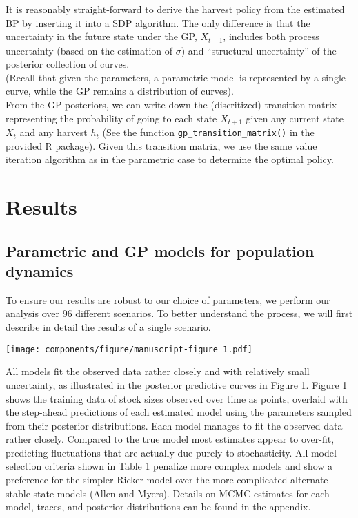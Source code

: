 \documentclass[]{components/elsarticle}
\begin{document}
It is reasonably straight-forward to derive the harvest policy from the
estimated BP by inserting it into a SDP algorithm. The only difference
is that the uncertainty in the future state under the GP, $X_{t+1}$,
includes both process uncertainty (based on the estimation of $\sigma$)
and ``structural uncertainty'' of the posterior collection of
curves.\\(Recall that given the parameters, a parametric model is
represented by a single curve, while the GP remains a distribution of
curves).\\From the GP posteriors, we can write down the (discritized)
transition matrix representing the probability of going to each state
$X_{t+1}$ given any current state $X_t$ and any harvest $h_t$ (See the
function \texttt{gp\_transition\_matrix()} in the provided R package).
Given this transition matrix, we use the same value iteration algorithm
as in the parametric case to determine the optimal policy.

\section{Results}\label{results}

\subsection{Parametric and GP models for population
dynamics}\label{parametric-and-gp-models-for-population-dynamics}

To ensure our results are robust to our choice of parameters, we perform
our analysis over 96 different scenarios. To better understand the
process, we will first describe in detail the results of a single
scenario.

\texttt{[image: components/figure/manuscript-figure\_1.pdf]}

All models fit the observed data rather closely and with relatively
small uncertainty, as illustrated in the posterior predictive curves in
Figure 1. Figure 1 shows the training data of stock sizes observed over
time as points, overlaid with the step-ahead predictions of each
estimated model using the parameters sampled from their posterior
distributions. Each model manages to fit the observed data rather
closely. Compared to the true model most estimates appear to over-fit,
predicting fluctuations that are actually due purely to stochasticity.
All model selection criteria shown in Table 1 penalize more complex
models and show a preference for the simpler Ricker model over the more
complicated alternate stable state models (Allen and Myers). Details on
MCMC estimates for each model, traces, and posterior distributions can
be found in the appendix.
\end{document}
